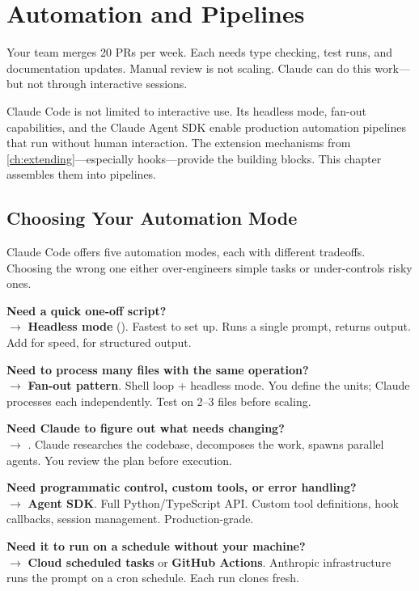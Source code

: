 \chapter{Automation and Pipelines}
\label{ch:automation}

\begin{itshape}
Your team merges 20 PRs per week. Each needs type checking, test runs,
and documentation updates. Manual review is not scaling.
Claude can do this work---but not through interactive sessions.
\end{itshape}

Claude Code is not limited to interactive use.
Its headless mode, fan-out capabilities, and the Claude Agent SDK
enable production automation pipelines that run without human interaction.
The extension mechanisms from \cref{ch:extending}---especially hooks---provide
the building blocks. This chapter assembles them into pipelines.

\section{Choosing Your Automation Mode}
\label{sec:automation-strategy}


Claude Code offers five automation modes, each with different tradeoffs.
Choosing the wrong one either over-engineers simple tasks or
under-controls risky ones.

\begin{decisionbox}
\textbf{Need a quick one-off script?}\\
$\rightarrow$ \textbf{Headless mode} (). Fastest to set up.
Runs a single prompt, returns output. Add  for
speed,  for structured output.

\textbf{Need to process many files with the same operation?}\\
$\rightarrow$ \textbf{Fan-out pattern}. Shell loop + headless mode.
You define the units; Claude processes each independently.
Test on 2--3 files before scaling.

\textbf{Need Claude to figure out what needs changing?}\\
$\rightarrow$ \textbf{}. Claude researches the codebase,
decomposes the work, spawns parallel agents.
You review the plan before execution.

\textbf{Need programmatic control, custom tools, or error handling?}\\
$\rightarrow$ \textbf{Agent SDK}. Full Python/TypeScript API.
Custom tool definitions, hook callbacks, session management.
Production-grade.

\textbf{Need it to run on a schedule without your machine?}\\
$\rightarrow$ \textbf{Cloud scheduled tasks} or \textbf{GitHub Actions}.
Anthropic infrastructure runs the prompt on a cron schedule.
Each run clones fresh.
\end{decisionbox}

